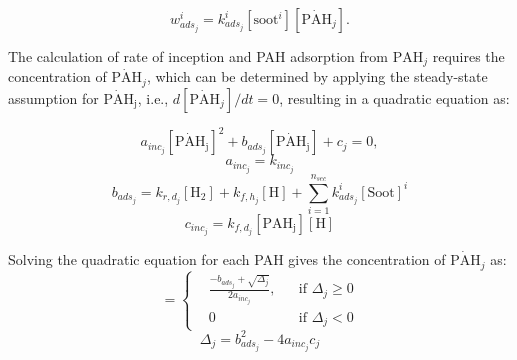 \begin{equation}
	w^i_{ads_j} = k^i_{ads_{j}} [\mathrm{soot}^i] [\mathrm{\dot{PAH}}_j].
\end{equation}

The calculation of rate of inception and PAH adsorption from $\mathrm{PAH}_j$ requires the concentration of $\mathrm{\dot{PAH}}_j$, which can be determined by applying the steady-state assumption for $\mathrm{\dot{PAH}_j}$, i.e., $d[\mathrm{\dot{PAH}}_j]/dt=0$, resulting in a quadratic equation as:




\begin{equation}
	a_{inc_j}[\mathrm{\dot{PAH}_j}]^2+
	b_{ads_j}[\mathrm{\dot{PAH}_j}] + c_j = 0,
\end{equation}
\begin{equation}
	a_{inc_j}=k_{inc_j}
\end{equation}
\begin{equation}
	b_{ads_j}=k_{r,d_j}[\mathrm{H_2}]+k_{f,h_j}[\mathrm{H}]+\sum_{i=1}^{n_{sec}}k^i_{ads_j}[\mathrm{Soot}]^i
\end{equation}
\begin{equation}
	c_{inc_j}=k_{f,d_j}[\mathrm{PAH_j}][\mathrm{H}]
\end{equation}

Solving the quadratic equation for each PAH gives the concentration of $\mathrm{\mathrm{\dot{PAH}}}_j$ as:
\begin{equation}
	[\mathrm{\mathrm{\dot{PAH}}_j}]=
	\left\{
	\begin{aligned}
		&\frac{-b_{ads_j}+\sqrt{\Delta_j}}{2a_{inc_j}},
		&&
		\text{if } \Delta_j \ge 0
		\\
		& 0 
		&&
		\text{if } \Delta_j < 0
	\end{aligned}
	\right.
	\label{eqn:rad_ebri}
\end{equation}
\begin{equation}
	\Delta_j = b_{ads_j}^2-4a_{inc_j}c_{j}
	\label{eqn:delta_ebri}
\end{equation}

